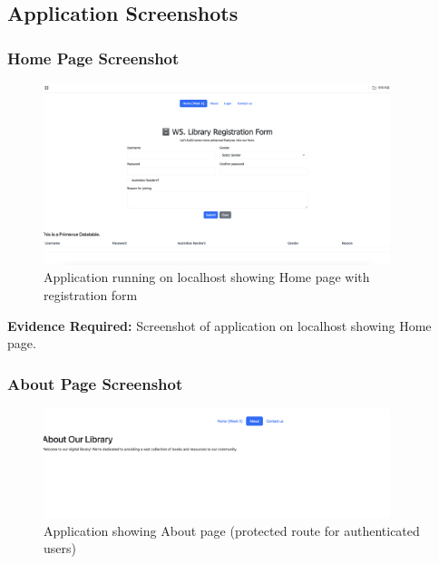 \documentclass[11pt,a4paper]{article}
\begin{document}
\newpage

\subsection{Application Screenshots}

\subsubsection{Home Page Screenshot}

\begin{figure}[h]
     \centering
     \includegraphics[width=0.9\textwidth]{home_page_localhost.png}
     \caption{Application running on localhost showing Home page with registration form}
     \label{fig:home_page}
\end{figure}

\textbf{Evidence Required:} Screenshot of application on localhost showing Home page.

\subsubsection{About Page Screenshot}

\begin{figure}[h]
     \centering
     \includegraphics[width=0.9\textwidth]{about_page_localhost.png}
     \caption{Application showing About page (protected route for authenticated users)}
     \label{fig:about_page}
\end{figure}
\end{document}
